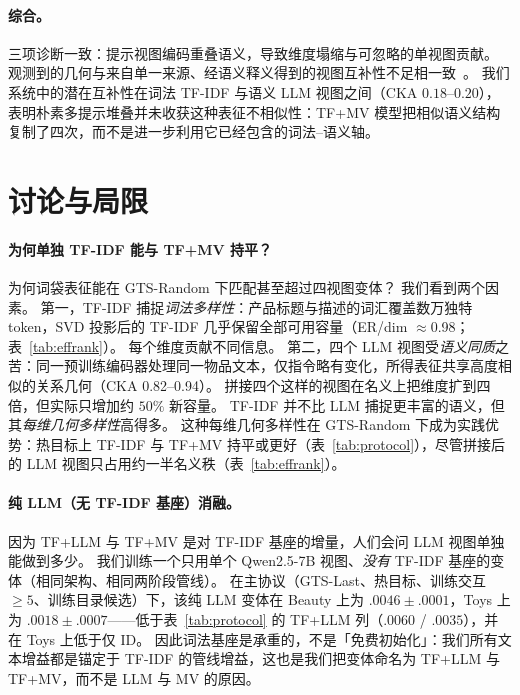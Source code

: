 \documentclass[sigconf,natbib=true,anonymous]{acmart}
\newcommand{\tfidf}{\textsc{TF-IDF}\xspace}
\newcommand{\llm}{\textsc{LLM}\xspace}
\newcommand{\tfllm}{\textsc{TF+LLM}\xspace}
\newcommand{\tfmv}{\textsc{TF+MV}\xspace}
\begin{document}
\paragraph{综合。}
三项诊断一致：提示视图编码重叠语义，导致维度塌缩与可忽略的单视图贡献。
观测到的几何与来自单一来源、经语义释义得到的视图互补性不足相一致~\cite{xu2013multiview}。
我们系统中的潜在互补性在词法 \tfidf 与语义 \llm 视图之间（CKA $0.18$--$0.20$），表明朴素多提示堆叠并未收获这种表征不相似性：\tfmv 模型把相似语义结构复制了四次，而不是进一步利用它已经包含的词法--语义轴。

\section{讨论与局限}
\label{sec:discussion}

\paragraph{为何单独 TF-IDF 能与 \tfmv 持平？}
为何词袋表征能在 GTS-Random 下匹配甚至超过四视图变体？
我们看到两个因素。
第一，\tfidf 捕捉\emph{词法多样性}：产品标题与描述的词汇覆盖数万独特 token，SVD 投影后的 TF-IDF 几乎保留全部可用容量（ER/dim $\approx$0.98；表~\ref{tab:effrank}）。
每个维度贡献不同信息。
第二，四个 LLM 视图受\emph{语义同质}之苦：同一预训练编码器处理同一物品文本，仅指令略有变化，所得表征共享高度相似的关系几何（CKA 0.82--0.94）。
拼接四个这样的视图在名义上把维度扩到四倍，但实际只增加约 $50\%$ 新容量。
TF-IDF 并不比 LLM 捕捉更丰富的语义，但其\emph{每维几何多样性}高得多。
这种每维几何多样性在 GTS-Random 下成为实践优势：热目标上 \tfidf 与 \tfmv 持平或更好（表~\ref{tab:protocol}），尽管拼接后的 LLM 视图只占用约一半名义秩（表~\ref{tab:effrank}）。

\paragraph{纯 LLM（无 \tfidf 基座）消融。}
因为 \tfllm 与 \tfmv 是对 \tfidf 基座的增量，人们会问 LLM 视图单独能做到多少。
我们训练一个只用单个 Qwen2.5-7B 视图、\emph{没有} \tfidf 基座的变体（相同架构、相同两阶段管线）。
在主协议（GTS-Last、热目标、训练交互 $\ge 5$、训练目录候选）下，该纯 LLM 变体在 Beauty 上为 $.0046\pm.0001$，Toys 上为 $.0018\pm.0007$——低于表~\ref{tab:protocol} 的 \tfllm 列（$.0060$ / $.0035$），并在 Toys 上低于仅 ID。
因此词法基座是承重的，不是「免费初始化」：我们所有文本增益都是锚定于 \tfidf 的管线增益，这也是我们把变体命名为 \tfllm 与 \tfmv，而不是 LLM 与 MV 的原因。
\end{document}
